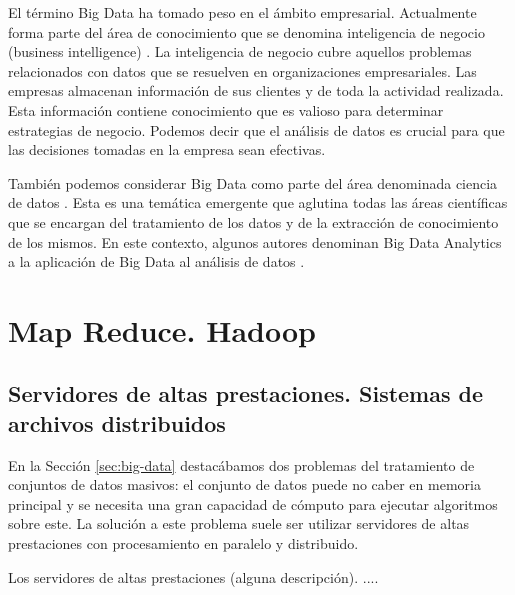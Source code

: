 \documentclass[10pt]{article}
\begin{document}
	El término Big Data ha tomado peso en el ámbito empresarial. Actualmente forma parte del área de conocimiento que se denomina inteligencia de negocio (business intelligence) \cite{business-intelligence}. La inteligencia de negocio cubre aquellos problemas relacionados con datos que se resuelven en organizaciones empresariales. Las empresas almacenan información de sus clientes y de toda la actividad realizada. Esta información contiene conocimiento que es valioso para determinar estrategias de negocio. Podemos decir que el análisis de datos es crucial para que las decisiones tomadas en la empresa sean efectivas. 

	También podemos considerar Big Data como parte del área denominada ciencia de datos \cite{data-science}. Esta es una temática emergente que aglutina todas las áreas científicas que se encargan del tratamiento de los datos y de la extracción de conocimiento de los mismos. En este contexto, algunos autores denominan Big Data Analytics a la aplicación de Big Data al análisis de datos \cite{big-data-trends}. 


\section{Map Reduce. Hadoop} \label{sec:map-reduce}


	\subsection{Servidores de altas prestaciones. Sistemas de archivos distribuidos}

		En la Sección \ref{sec:big-data} destacábamos dos problemas del tratamiento de conjuntos de datos masivos: el conjunto de datos puede no caber en memoria principal y se necesita una gran capacidad de cómputo para ejecutar algoritmos sobre este. La solución a este problema suele ser utilizar servidores de altas prestaciones con procesamiento en paralelo y distribuido.
	
		Los servidores de altas prestaciones (alguna descripción). .... 
		
\end{document}
